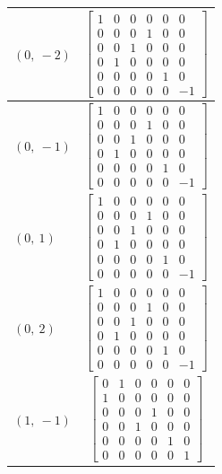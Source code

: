 \documentclass[11pt]{article}
\theoremstyle{definition}
\begin{document}
\begin{longtable}{|l|c|}
    \hline
    $\left( 0, \  -2\right)$ & ${\left[\begin{matrix}1 & 0 & 0 & 0 & 0 & 0\\0 & 0 & 0 & 1 & 0 & 0\\0 & 0 & 1 & 0 & 0 & 0\\0 & 1 & 0 & 0 & 0 & 0\\0 & 0 & 0 & 0 & 1 & 0\\0 & 0 & 0 & 0 & 0 & -1\end{matrix}\right]}$ \\
    \hline
    $\left( 0, \  -1\right)$ & ${\left[\begin{matrix}1 & 0 & 0 & 0 & 0 & 0\\0 & 0 & 0 & 1 & 0 & 0\\0 & 0 & 1 & 0 & 0 & 0\\0 & 1 & 0 & 0 & 0 & 0\\0 & 0 & 0 & 0 & 1 & 0\\0 & 0 & 0 & 0 & 0 & -1\end{matrix}\right]}$ \\
    \hline
    $\left( 0, \  1\right)$ & ${\left[\begin{matrix}1 & 0 & 0 & 0 & 0 & 0\\0 & 0 & 0 & 1 & 0 & 0\\0 & 0 & 1 & 0 & 0 & 0\\0 & 1 & 0 & 0 & 0 & 0\\0 & 0 & 0 & 0 & 1 & 0\\0 & 0 & 0 & 0 & 0 & -1\end{matrix}\right]}$ \\
    \hline
    $\left( 0, \  2\right)$ & ${\left[\begin{matrix}1 & 0 & 0 & 0 & 0 & 0\\0 & 0 & 0 & 1 & 0 & 0\\0 & 0 & 1 & 0 & 0 & 0\\0 & 1 & 0 & 0 & 0 & 0\\0 & 0 & 0 & 0 & 1 & 0\\0 & 0 & 0 & 0 & 0 & -1\end{matrix}\right]}$ \\
    \hline
    $\left( 1, \  -1\right)$ & ${\left[\begin{matrix}0 & 1 & 0 & 0 & 0 & 0\\1 & 0 & 0 & 0 & 0 & 0\\0 & 0 & 0 & 1 & 0 & 0\\0 & 0 & 1 & 0 & 0 & 0\\0 & 0 & 0 & 0 & 1 & 0\\0 & 0 & 0 & 0 & 0 & 1\end{matrix}\right]}$ \\

\end{longtable}
\end{document}
